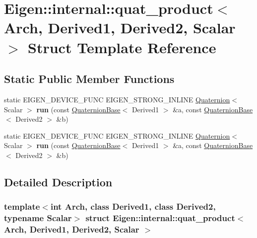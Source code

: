 \hypertarget{struct_eigen_1_1internal_1_1quat__product}{}\section{Eigen\+:\+:internal\+:\+:quat\+\_\+product$<$ Arch, Derived1, Derived2, Scalar $>$ Struct Template Reference}
\label{struct_eigen_1_1internal_1_1quat__product}
\subsection*{Static Public Member Functions}
\begin{DoxyCompactItemize}
\item 
\mbox{\label{struct_eigen_1_1internal_1_1quat__product_a84c5271d02e088d165237397504795b8}} 
static E\+I\+G\+E\+N\+\_\+\+D\+E\+V\+I\+C\+E\+\_\+\+F\+U\+NC E\+I\+G\+E\+N\+\_\+\+S\+T\+R\+O\+N\+G\+\_\+\+I\+N\+L\+I\+NE \hyperlink{group___geometry___module_class_eigen_1_1_quaternion}{Quaternion}$<$ Scalar $>$ {\bfseries run} (const \hyperlink{group___geometry___module_class_eigen_1_1_quaternion_base}{Quaternion\+Base}$<$ Derived1 $>$ \&a, const \hyperlink{group___geometry___module_class_eigen_1_1_quaternion_base}{Quaternion\+Base}$<$ Derived2 $>$ \&b)
\item 
\mbox{\label{struct_eigen_1_1internal_1_1quat__product_a84c5271d02e088d165237397504795b8}} 
static E\+I\+G\+E\+N\+\_\+\+D\+E\+V\+I\+C\+E\+\_\+\+F\+U\+NC E\+I\+G\+E\+N\+\_\+\+S\+T\+R\+O\+N\+G\+\_\+\+I\+N\+L\+I\+NE \hyperlink{group___geometry___module_class_eigen_1_1_quaternion}{Quaternion}$<$ Scalar $>$ {\bfseries run} (const \hyperlink{group___geometry___module_class_eigen_1_1_quaternion_base}{Quaternion\+Base}$<$ Derived1 $>$ \&a, const \hyperlink{group___geometry___module_class_eigen_1_1_quaternion_base}{Quaternion\+Base}$<$ Derived2 $>$ \&b)
\end{DoxyCompactItemize}


\subsection{Detailed Description}
\subsubsection*{template$<$int Arch, class Derived1, class Derived2, typename Scalar$>$\newline
struct Eigen\+::internal\+::quat\+\_\+product$<$ Arch, Derived1, Derived2, Scalar $>$}



